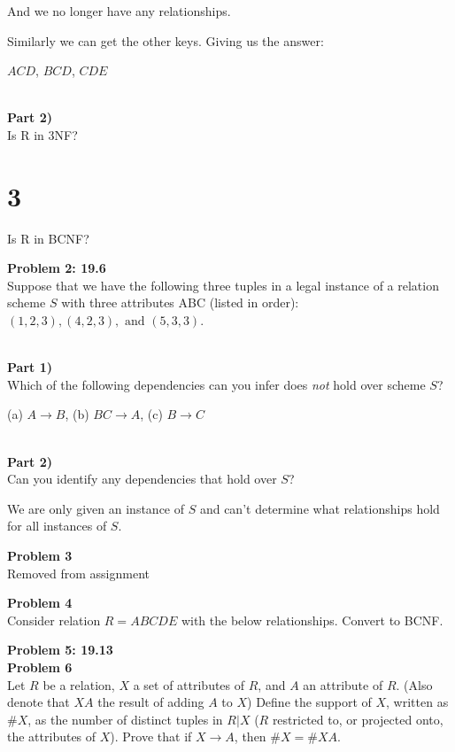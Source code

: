 \documentclass[12pt,letter]{article}
\newcommand{\problem}[1]{\vspace{3mm}\Large\textbf{{Problem
{#1}\vspace{3mm}}}\normalsize\\}
\newcommand{\ppart}[1]{\vspace{2mm}\large\textbf{\\Part
{#1})\vspace{2mm}}\normalsize\\}
\begin{document}
And we no longer have any relationships.

Similarly we can get the other keys. Giving us the answer:

$ACD$, $BCD$, $CDE$

\ppart{2}
Is R in 3NF?

\part{3}
Is R in BCNF?

\problem{2: 19.6}
Suppose that we have the following three tuples in a legal instance of a
relation scheme $S$ with three attributes ABC (listed in order): $(1,2,3),
(4,2,3), \text{ and } (5,3,3)$.

\ppart{1}
Which of the following dependencies can you infer does \textit{not} hold over
scheme $S$?

(a) $A \rightarrow B$, (b) $BC \rightarrow A$, (c) $B \rightarrow C$

\ppart{2}
Can you identify any dependencies that hold over $S$?

We are only given an instance of $S$ and can't determine what relationships hold
for all instances of $S$.

\problem{3}
Removed from assignment

\problem{4}
Consider relation $R = ABCDE$ with the below relationships. Convert to BCNF.

\begin{figure}[ht!]
    \center
{}
\end{figure}

\problem{5: 19.13}

\problem{6}
Let $R$ be a relation, $X$ a set of attributes of $R$, and $A$ an attribute of
$R$. (Also denote that $XA$ the result of adding $A$ to $X$) Define the support
of $X$, written as $\#X$, as the number of distinct tuples in $R|X$ ($R$
restricted to, or projected onto, the attributes of $X$). Prove that if $X
\rightarrow A$, then $\#X = \#XA$.
\end{document}
